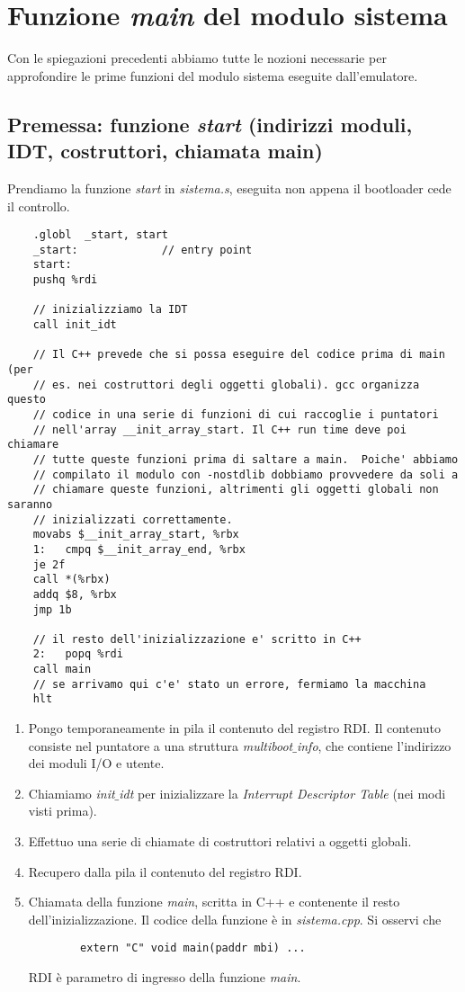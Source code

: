 
\chapter{Funzione \emph{main} del modulo sistema}
Con le spiegazioni precedenti abbiamo tutte le nozioni necessarie per approfondire le prime funzioni del modulo sistema eseguite dall'emulatore.
\section{Premessa: funzione \emph{start} (indirizzi moduli, IDT, costruttori, chiamata main)}
Prendiamo la funzione \emph{start} in \emph{sistema.s}, eseguita non appena il bootloader cede il controllo.
\small
\begin{verbatim}
	.globl  _start, start
	_start:				// entry point
	start:
	pushq %rdi
	
	// inizializziamo la IDT
	call init_idt
	
	// Il C++ prevede che si possa eseguire del codice prima di main (per
	// es. nei costruttori degli oggetti globali). gcc organizza questo
	// codice in una serie di funzioni di cui raccoglie i puntatori
	// nell'array __init_array_start. Il C++ run time deve poi chiamare
	// tutte queste funzioni prima di saltare a main.  Poiche' abbiamo
	// compilato il modulo con -nostdlib dobbiamo provvedere da soli a
	// chiamare queste funzioni, altrimenti gli oggetti globali non saranno
	// inizializzati correttamente.
	movabs $__init_array_start, %rbx
	1:	 cmpq $__init_array_end, %rbx
	je 2f
	call *(%rbx)
	addq $8, %rbx
	jmp 1b
	
	// il resto dell'inizializzazione e' scritto in C++
	2:	 popq %rdi
	call main
	// se arrivamo qui c'e' stato un errore, fermiamo la macchina
	hlt
\end{verbatim}
\normalsize 
\begin{enumerate}
	\item Pongo temporaneamente in pila il contenuto del registro RDI. Il contenuto consiste nel puntatore a una struttura \emph{multiboot$\_$info}, che contiene l'indirizzo dei moduli I/O e utente. 
	\item Chiamiamo \emph{init$\_$idt} per inizializzare la \emph{Interrupt Descriptor Table} (nei modi visti prima).
	\item Effettuo una serie di chiamate di costruttori relativi a oggetti globali.
	\item Recupero dalla pila il contenuto del registro RDI.
	\item Chiamata della funzione \emph{main}, scritta in C++ e contenente il resto dell'inizializzazione. Il codice della funzione è in \emph{sistema.cpp}. Si osservi che
	\begin{verbatim}
		extern "C" void main(paddr mbi) ...
	\end{verbatim}
	RDI è parametro di ingresso della funzione \emph{main}.
\end{enumerate}

